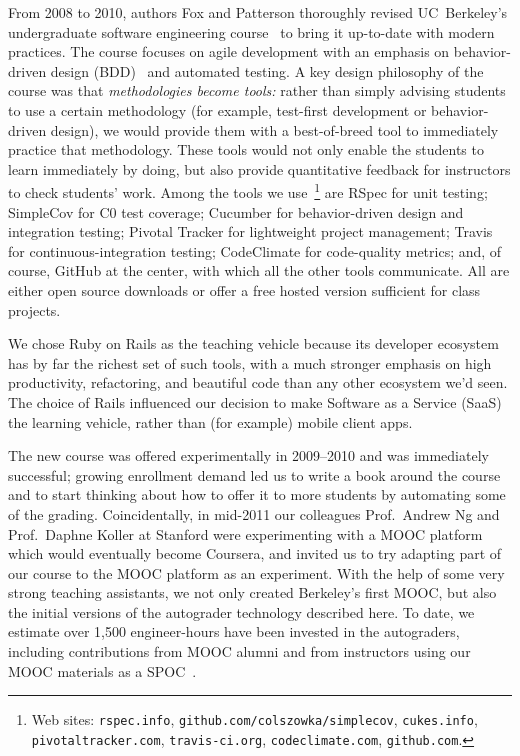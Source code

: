 From 2008 to 2010, authors Fox and Patterson thoroughly revised
UC~Berkeley's undergraduate software engineering
course~\cite{crossing_the_software_chasm,agile_sw_curriculum} to bring
it up-to-date with modern practices.  The course focuses on agile
development with an emphasis on
behavior-driven design (BDD)~\cite{bdd} and automated testing.  A key
design philosophy of the course was that \emph{methodologies become
tools:\/} rather than simply advising students to use a certain
methodology (for example, test-first development or behavior-driven
design), we would provide them with a best-of-breed tool to immediately
practice that methodology.  These tools would not only enable the
students to learn immediately by doing, but also provide quantitative
feedback for instructors to check students' work.  Among the tools we
use~\footnote{Web
sites: \texttt{rspec.info}, \texttt{github.com/colszowka/simplecov}, \texttt{cukes.info}, \texttt{pivotaltracker.com}, \texttt{travis-ci.org}, \texttt{codeclimate.com}, \texttt{github.com}.} 
are 
RSpec for unit testing; 
SimpleCov for C0 test coverage; 
Cucumber for behavior-driven design and integration testing; 
Pivotal Tracker for lightweight project management;
Travis for continuous-integration testing; 
CodeClimate for code-quality metrics;
and, of course, GitHub at the center, with which all the
other tools communicate.  All are either open source downloads or offer a free
hosted version sufficient for class projects.

We chose Ruby on Rails as the teaching vehicle because its developer
ecosystem has by far the richest set of such tools, with a much stronger
emphasis on high productivity, refactoring, and beautiful code than any
other ecosystem we'd seen.
The choice of Rails influenced our decision to make Software as a
Service (SaaS) the learning vehicle, rather than (for example) mobile
client apps.

The new course was offered experimentally in 2009--2010 and was
immediately successful; growing enrollment demand led 
us to write a book around the course~\cite{esaaS} and to start thinking
about how to offer it to more students by automating some of the
grading.  Coincidentally, in mid-2011 our colleagues Prof.~Andrew Ng
and Prof.~Daphne Koller at Stanford were experimenting with a MOOC
platform which would eventually become Coursera, and invited us to try
adapting part of our course to the MOOC 
platform as an experiment.  With the help of some very strong teaching
assistants, we not only created Berkeley's first MOOC, but also the
initial versions of the autograder technology described here.  To date,
we estimate over 1,500 engineer-hours have been invested in the
autograders, including contributions from MOOC alumni and from
instructors using our MOOC materials as a SPOC~\cite{moocs-spocs-TR}.

